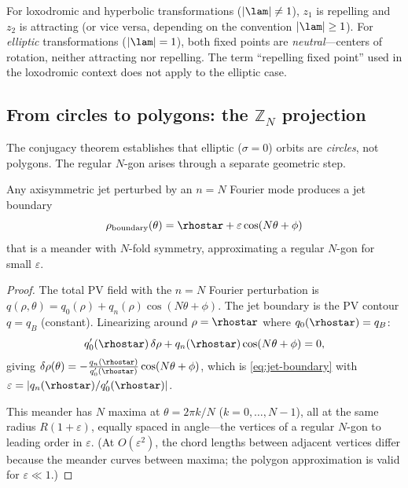 \begin{remark}\label{rem:fixed-points}
For loxodromic and hyperbolic transformations ($|\lam| \neq 1$), $z_1$
is repelling and $z_2$ is attracting (or vice versa, depending on the
convention $|\lam| \ge 1$).  For \emph{elliptic} transformations
($|\lam| = 1$), both fixed points are \emph{neutral}---centers of
rotation, neither attracting nor repelling.  The term ``repelling fixed
point'' used in the loxodromic context does not apply to the elliptic
case.
\end{remark}

\subsection{From circles to polygons: the \texorpdfstring{$\mathbb{Z}_N$}{Z\_N}
projection}
\label{sec:circle-to-polygon}

The conjugacy theorem establishes that elliptic ($\sigma = 0$) orbits are
\emph{circles}, not polygons.  The regular $N$-gon arises through a
separate geometric step.

\begin{proposition}
\label{prop:polygon}
Any axisymmetric jet perturbed by an $n = N$ Fourier mode produces a
jet boundary
\begin{equation}\label{eq:jet-boundary}
  \rho_{\mathrm{boundary}}(\theta) = \rhostar + \varepsilon\cos(N\theta + \phi)
\end{equation}
that is a meander with $N$-fold symmetry, approximating a regular $N$-gon
for small $\varepsilon$.
\end{proposition}

\begin{proof}
The total PV field with the $n = N$ Fourier perturbation is
$q(\rho, \theta) = q_0(\rho) + q_n(\rho)\cos(N\theta + \phi)$.
The jet boundary is the PV contour $q = q_B$ (constant).  Linearizing
around $\rho = \rhostar$ where $q_0(\rhostar) = q_B$:
\[
  q_0'(\rhostar)\,\delta\rho + q_n(\rhostar)\cos(N\theta + \phi) = 0,
\]
giving $\delta\rho(\theta) = -\frac{q_n(\rhostar)}{q_0'(\rhostar)}
\cos(N\theta + \phi)$, which is \eqref{eq:jet-boundary} with
$\varepsilon = |q_n(\rhostar)/q_0'(\rhostar)|$.

This meander has $N$ maxima at $\theta = 2\pi k/N$ ($k = 0, \ldots, N-1$),
all at the same radius $R(1 + \varepsilon)$, equally spaced in angle---the
vertices of a regular $N$-gon to leading order in $\varepsilon$.  (At
$O(\varepsilon^2)$, the chord lengths between adjacent vertices differ
because the meander curves between maxima; the polygon approximation is
valid for $\varepsilon \ll 1$.)
\end{proof}

